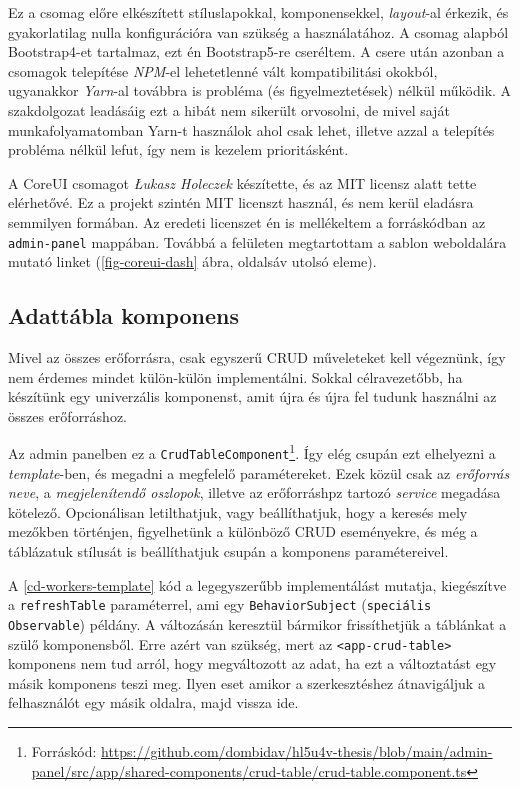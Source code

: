 \documentclass[a4paper,12pt]{thesis-ekf}
\theoremstyle{definition}
\begin{document}
		    Ez a csomag előre elkészített stíluslapokkal, komponensekkel, \emph{layout}-al érkezik, és gyakorlatilag nulla konfigurációra van szükség a használatához\cite{coreui-intro}. A csomag alapból Bootstrap4-et tartalmaz, ezt én Bootstrap5-re cseréltem. A csere után azonban a csomagok telepítése \emph{NPM}-el lehetetlenné vált kompatibilitási okokból, ugyanakkor \emph{Yarn}-al továbbra is probléma (és figyelmeztetések) nélkül működik. A szakdolgozat leadásáig ezt a hibát nem sikerült orvosolni, de mivel saját munkafolyamatomban Yarn-t használok ahol csak lehet, illetve azzal a telepítés probléma nélkül lefut, így nem is kezelem prioritásként.
		    
		    A CoreUI csomagot \emph{Łukasz Holeczek} készítette, és az MIT licensz alatt tette elérhetővé. Ez a projekt szintén MIT licenszt használ, és nem kerül eladásra semmilyen formában. Az eredeti licenszet én is mellékeltem a forráskódban az \verb|admin-panel| mappában\cite{coreui-mit}. Továbbá a felületen megtartottam a sablon weboldalára mutató linket (\ref{fig-coreui-dash} ábra, oldalsáv utolsó eleme).
		    
		    
		    \subsection{Adattábla komponens}
		    Mivel az összes erőforrásra, csak egyszerű CRUD műveleteket kell végeznünk, így nem érdemes mindet külön-külön implementálni. Sokkal célravezetőbb, ha készítünk egy univerzális komponenst, amit újra és újra fel tudunk használni az összes erőforráshoz. 
		    
		    Az admin panelben ez a \verb|CrudTableComponent|\footnote{Forráskód: \url{https://github.com/dombidav/hl5u4v-thesis/blob/main/admin-panel/src/app/shared-components/crud-table/crud-table.component.ts}}. Így elég csupán ezt elhelyezni a \emph{template}-ben, és megadni a megfelelő paramétereket. Ezek közül csak az \emph{erőforrás neve}, a \emph{megjelenítendő oszlopok}, illetve az erőforráshpz tartozó \emph{service} megadása kötelező. Opcionálisan letilthatjuk, vagy beállíthatjuk, hogy a keresés mely mezőkben történjen, figyelhetünk a különböző CRUD eseményekre, és még a táblázatuk stílusát is beállíthatjuk csupán a komponens paramétereivel. 
		    
		    \pagebreak
		    
		    A  \ref{cd-workers-template} kód a legegyszerűbb implementálást mutatja, kiegészítve a \verb|refreshTable| paraméterrel, ami egy \texttt{BehaviorSubject} (\texttt{speciális Observable}) példány. A változásán keresztül bármikor frissíthetjük a táblánkat a szülő komponensből. Erre azért van szükség, mert az \verb|<app-crud-table>| komponens nem tud arról, hogy megváltozott az adat, ha ezt a változtatást egy másik komponens teszi meg. Ilyen eset amikor a szerkesztéshez átnavigáljuk a felhasználót egy másik oldalra, majd vissza ide.
		    
\end{document}
